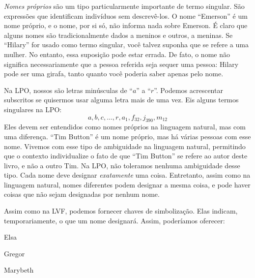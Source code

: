 \emph{Nomes próprios} são um tipo particularmente importante de termo singular. São expressões que identificam indivíduos sem descrevê-los. O nome \textquotedblleft Emerson\textquotedblright{} é um nome próprio, e o nome, por si só, não informa nada sobre Emerson. É claro que alguns nomes são tradicionalmente dados a meninos e outros, a meninas. Se \textquotedblleft Hilary\textquotedblright{} for usado como termo singular, você talvez suponha que se refere a uma mulher. No entanto, essa suposição pode estar errada. De fato, o nome não significa necessariamente que a pessoa referida seja sequer uma pessoa: Hilary pode ser uma girafa, tanto quanto você poderia saber apenas pelo nome.

Na LPO, nossos  são letras minúsculas de \textquotedblleft $a$\textquotedblright{} a \textquotedblleft $r$\textquotedblright{}. Podemos acrescentar subscritos se quisermos usar alguma letra mais de uma vez. Eis alguns termos singulares na LPO:
	$$a,b,c,\ldots, r, a_1, f_{32}, j_{390}, m_{12}$$
Eles devem ser entendidos como nomes próprios na linguagem natural, mas com uma diferença. \textquotedblleft Tim Button\textquotedblright{} é um nome próprio, mas há várias pessoas com esse nome. Vivemos com esse tipo de ambiguidade na linguagem natural, permitindo que o contexto individualize o fato de que \textquotedblleft Tim Button\textquotedblright{} se refere ao autor deste livro, e não a outro Tim. Na LPO, não toleramos nenhuma ambiguidade desse tipo. Cada nome deve designar \emph{exatamente} uma coisa. Entretanto, assim como na linguagem natural, nomes diferentes podem designar a mesma coisa, e pode haver coisas que não sejam designadas por nenhum nome.


Assim como na LVF, podemos fornecer chaves de simbolização. Elas indicam, temporariamente, o que um nome designará. Assim, poderíamos oferecer:
	\begin{ekey}
		\item[e] Elsa
		\item[g] Gregor
		\item[m] Marybeth
	\end{ekey}


